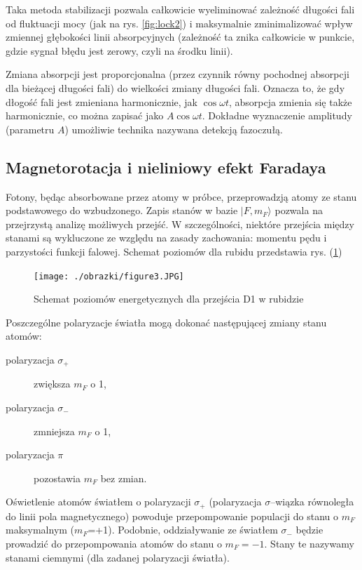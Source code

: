 \documentclass[a4paper,10pt]{article}
\begin{document}
 Taka metoda stabilizacji pozwala całkowicie wyeliminować zależność długości fali od fluktuacji mocy (jak na rys. \ref{fig:lock2})  i maksymalnie zminimalizować wpływ zmiennej głębokości linii absorpcyjnych (zależność ta znika całkowicie w punkcie, gdzie sygnał błędu jest zerowy, czyli na środku linii).

Zmiana absorpcji jest proporcjonalna (przez czynnik równy pochodnej absorpcji dla bieżącej długości fali) do wielkości zmiany długości fali. Oznacza to, że gdy dłogość fali jest zmieniana harmonicznie, jak $\cos \omega t$, absorpcja zmienia się także harmonicznie, co można zapisać jako $A \cos \omega t$. Dokładne wyznaczenie amplitudy (parametru $A$)
umożliwie technika nazywana detekcją fazoczułą.

\subsection{Magnetorotacja i nieliniowy efekt Faradaya}

Fotony, będąc absorbowane przez atomy w próbce, przeprowadzją atomy ze stanu podstawowego do wzbudzonego.
Zapis stanów w bazie $|F,m_F\rangle$ pozwala na przejrzystą analizę możliwych przejść.
W szczególności, niektóre przejścia między stanami są wykluczone ze względu na zasady zachowania: momentu pędu i parzystości funkcji falowej. Schemat poziomów dla rubidu przedstawia rys. (\ref{poziomyRb})


\begin{figure}
\begin{center}
 \texttt{[image: ./obrazki/figure3.JPG]}
\end{center}
\caption{Schemat poziomów energetycznych dla przejścia D1 w rubidzie}
\label{poziomyRb}
\end{figure}

Poszczególne polaryzacje światła mogą dokonać następującej zmiany stanu atomów:
\begin{center}
\begin{description}
\item[polaryzacja $\sigma_+$] zwiększa $m_F$ o 1,
\item[polaryzacja $\sigma_-$] zmniejsza $m_F$ o 1,
\item[polaryzacja $\pi$] pozostawia $m_F$ bez zmian.
\end{description}
\end{center}

Oświetlenie atomów światłem o polaryzacji $\sigma_+$ (polaryzacja $\sigma$--wiązka równoległa do linii pola magnetycznego) powoduje przepompowanie populacji do stanu o $m_F$ maksymalnym ($m_F$=+1). Podobnie, oddziaływanie ze światłem $\sigma_-$ będzie prowadzić do przepompowania atomów do stanu o $m_F=-1$. Stany te nazywamy stanami ciemnymi (dla zadanej polaryzacji światła).
\end{document}
